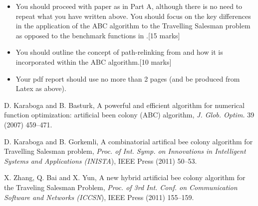 \documentclass{article}
\begin{document}
\begin{itemize}

\item You should proceed with paper \cite{KG11} as in Part A, although there is no need to repeat what you have written above. You should focus on the key differences in the application of the ABC algorithm to the Travelling Salesman problem as opposed to the benchmark functions in \cite{KB07}.\hfill[15 marks]

\item You should outline the concept of path-relinking from \cite{XBY11} and how it is incorporated within the ABC algorithm.\hfill[10 marks]

\item Your pdf report should use no more than 2 pages (and be produced from Latex as above).

\end{itemize}


\begin{thebibliography}{99}

 D. Karaboga and B. Basturk, A powerful and efficient algorithm for numerical function optimization: artificial been colony (ABC) algorithm, \emph{J. Glob. Optim.\/} 39 (2007) 459--471.

 D. Karaboga and B. Gorkemli, A combinatorial artifical bee colony algorithm for Travelling Salesman problem, \emph{Proc. of Int. Symp. on Innovations in Intelligent Systems and Applications \emph{(}INISTA\/}), IEEE Press (2011) 50--53.

 X. Zhang, Q. Bai and X. Yun, A new hybrid artificial bee colony algorithm for the Traveling Salesman Problem, \emph{Proc. of \emph{3}rd Int. Conf. on Communication Software and Networks \emph{(}ICCSN\/}), IEEE Press (2011) 155--159.

\end{thebibliography}
\end{document}
